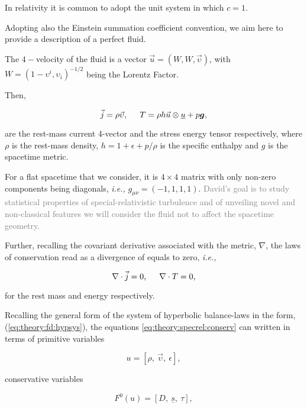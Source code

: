 In relativity it is common to adopt the unit system in which $c=1$. 

Adopting also the Einstein summation coefficient convention, we aim here to provide a description of a perfect fluid. 

The $4-$velocity of the fluid is a vector $\vec{u} = (W, W, \vec{\upsilon})$, with $W = (1 - \upsilon^i , \upsilon_i)^{-1/2}$ being the Lorentz Factor. 

Then, 

\begin{equation}
\vec{j} = \rho\vec{\upsilon}, \hspace{5mm} T = \rho h \vec{u} \otimes \underline{u} + p\boldsymbol{g},
\end{equation}

are the rest-mass current 4-vector and the stress energy tensor respectively, where $\rho$ is the rest-mass density, $h=1+\epsilon+p/\rho$ is the specific enthalpy and $g$ is the spacetime metric. 

For a flat spacetime that we consider, it is $4\times 4$ matrix with only non-zero components being diagonals, \textit{i.e.,} $g_{\mu\nu}=(-1,1,1,1)$.
\textcolor{gray}{David's goal is to study statistical properties of special-relativistic turbulence and of unveiling novel and non-classical features we will consider the fluid not to affect the spacetime geometry.}

Further, recalling the covariant derivative associated with the metric, $\nabla$, the laws of conservation read as a divergence of equals to zero, \textit{i.e.,}

\begin{equation}
\nabla\cdot\vec{j}=0,\hspace{5mm}\nabla\cdot T = 0,
\label{eq:theory:specrel:conserv}
\end{equation}

for the rest mass and energy respectively. 

Recalling the general form of the system of hyperbolic balance-laws in the form, (\ref{eq:theory:fd:hypsys}), the equations \ref{eq:theory:specrel:conserv} can written in terms of primitive variables 

\begin{equation}
u = [\rho, \: \vec{\upsilon}, \: \epsilon],
\end{equation}

conservative variables 

\begin{equation}
F^0(u) = [D, \: \underline{s}, \: \tau],
\end{equation}

